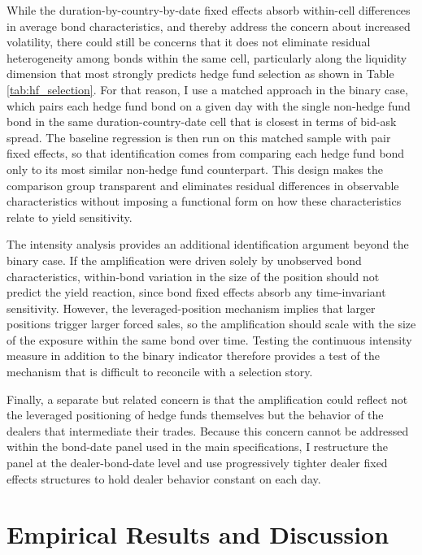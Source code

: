 \documentclass[english, 11pt, oneside]{article}
\begin{document}
While the duration-by-country-by-date fixed effects absorb within-cell differences in average bond characteristics, and thereby address the concern about increased volatility, there could still be concerns that it does not eliminate residual heterogeneity among bonds within the same cell, particularly along the liquidity dimension that most strongly predicts hedge fund selection as shown in Table \ref{tab:hf_selection}. For that reason, I use a matched approach in the binary case, which pairs each hedge fund bond on a given day with the single non-hedge fund bond in the same duration-country-date cell that is closest in terms of bid-ask spread. The baseline regression is then run on this matched sample with pair fixed effects, so that identification comes from comparing each hedge fund bond only to its most similar non-hedge fund counterpart. This design makes the comparison group transparent and eliminates residual differences in observable characteristics without imposing a functional form on how these characteristics relate to yield sensitivity.

The intensity analysis provides an additional identification argument beyond the binary case. If the amplification were driven solely by unobserved bond characteristics, within-bond variation in the size of the position should not predict the yield reaction, since bond fixed effects absorb any time-invariant sensitivity. However, the leveraged-position mechanism implies that larger positions trigger larger forced sales, so the amplification should scale with the size of the exposure within the same bond over time. Testing the continuous intensity measure in addition to the binary indicator therefore provides a test of the mechanism that is difficult to reconcile with a selection story.

Finally, a separate but related concern is that the amplification could reflect not the leveraged positioning of hedge funds themselves but the behavior of the dealers that intermediate their trades. Because this concern cannot be addressed within the bond-date panel used in the main specifications, I restructure the panel at the dealer-bond-date level and use progressively tighter dealer fixed effects structures to hold dealer behavior constant on each day.



\section{Empirical Results and Discussion}
\label{sec:empirical_results}
\end{document}
